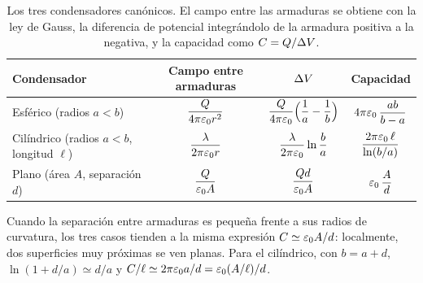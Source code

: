 \begin{table}[ht]
\centering
\caption{Los tres condensadores canónicos. El campo entre las armaduras se obtiene con la ley de Gauss, la diferencia de potencial integrándolo de la
armadura positiva a la negativa, y la capacidad como $C=Q/\Delta V$.}
\label{tab:canonicos}
\begin{tabular}{@{}lccc@{}}
  \toprule
  Condensador & Campo entre armaduras & $\Delta V$ & Capacidad\\
  \midrule
  Esférico (radios $a<b$) & $\dfrac{Q}{4\pi\varepsilon_{0} r^{2}}$ & $\dfrac{Q}{4\pi\varepsilon_{0}}\Bigl(\dfrac1a-\dfrac1b\Bigr)$ & $4\pi\varepsilon_{0}\,\dfrac{ab}{b-a}$\\[12pt]
  Cilíndrico (radios $a<b$, longitud $\ell$) & $\dfrac{\lambda}{2\pi\varepsilon_{0} r}$ & $\dfrac{\lambda}{2\pi\varepsilon_{0}}\ln\dfrac{b}{a}$ & $\dfrac{2\pi\varepsilon_{0}\,\ell}{\ln(b/a)}$\\[12pt]
  Plano (área $A$, separación $d$) & $\dfrac{Q}{\varepsilon_{0} A}$ & $\dfrac{Qd}{\varepsilon_{0} A}$ & $\varepsilon_{0}\,\dfrac{A}{d}$\\[8pt]
  \bottomrule
\end{tabular}
\end{table}

\begin{observacion}\label{obs:limite-plano}
Cuando la separación entre armaduras es pequeña frente a sus radios de curvatura, los tres casos tienden a la misma expresión $C\simeq\varepsilon_{0} A/d$: localmente,
dos superficies muy próximas se ven planas. Para el cilíndrico, con $b=a+d$, $\ln(1+d/a)\simeq d/a$ y $C/\ell\simeq2\pi\varepsilon_{0} a/d=\varepsilon_{0}(A/\ell)/d$.
\end{observacion}
